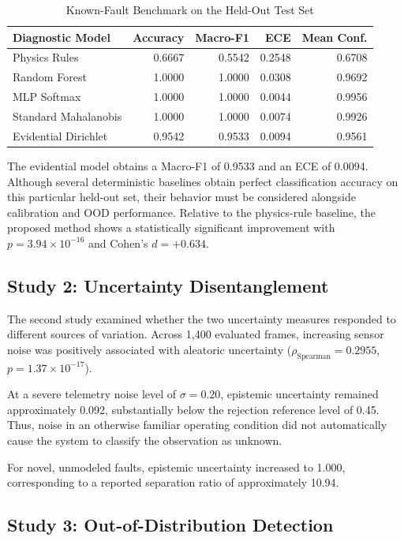 \documentclass[conference]{IEEEtran}
\begin{document}
\begin{table}[t]
\centering
\caption{Known-Fault Benchmark on the Held-Out Test Set}
\label{tab:known}
\small
\begin{tabular}{lrrrr}
\toprule
Diagnostic Model & Accuracy & Macro-F1 & ECE & Mean Conf.\\
\midrule
Physics Rules & 0.6667 & 0.5542 & 0.2548 & 0.6708\\
Random Forest & 1.0000 & 1.0000 & 0.0308 & 0.9692\\
MLP Softmax & 1.0000 & 1.0000 & 0.0044 & 0.9956\\
Standard Mahalanobis & 1.0000 & 1.0000 & 0.0074 & 0.9926\\
Evidential Dirichlet & 0.9542 & 0.9533 & 0.0094 & 0.9561\\
\bottomrule
\end{tabular}
\end{table}

The evidential model obtains a Macro-F1 of 0.9533 and an ECE of 0.0094.
Although several deterministic baselines obtain perfect classification
accuracy on this particular held-out set, their behavior must be considered
alongside calibration and OOD performance. Relative to the physics-rule
baseline, the proposed method shows a statistically significant improvement
with $p=3.94\times10^{-16}$ and Cohen's $d=+0.634$.

\subsection{Study 2: Uncertainty Disentanglement}

The second study examined whether the two uncertainty measures responded to
different sources of variation. Across 1,400 evaluated frames, increasing
sensor noise was positively associated with aleatoric uncertainty
($\rho_{\mathrm{Spearman}}=0.2955$, $p=1.37\times10^{-17}$).

At a severe telemetry noise level of $\sigma=0.20$, epistemic uncertainty
remained approximately 0.092, substantially below the rejection reference
level of 0.45. Thus, noise in an otherwise familiar operating condition did
not automatically cause the system to classify the observation as unknown.

For novel, unmodeled faults, epistemic uncertainty increased to 1.000,
corresponding to a reported separation ratio of approximately 10.94.

\subsection{Study 3: Out-of-Distribution Detection}
\end{document}
